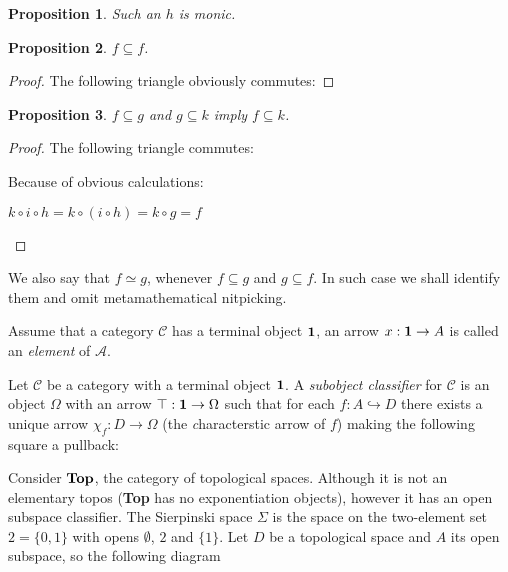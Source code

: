 \documentclass[a4paper]{article}
\theoremstyle{defin}
\theoremstyle{theorem}
\theoremstyle{claim}
\theoremstyle{prop}
\newtheorem{prop}{Proposition}
\theoremstyle{lemma}
\theoremstyle{fact}
\theoremstyle{ex}
\theoremstyle{col}
\begin{document}
\begin{prop}
Such an $h$ is monic.
\end{prop}

\begin{prop}
$f \subseteq f$.
\end{prop}

\begin{proof}
The following triangle obviously commutes:

\end{proof}

\begin{prop}
$f \subseteq g$ and $g \subseteq k$ imply $f \subseteq k$.
\end{prop}

\begin{proof}
The following triangle commutes:

Because of obvious calculations:
\begin{center}
$k \circ i \circ h = k \circ (i \circ h) = k \circ g = f$
\end{center}
\end{proof}

We also say that $f \simeq g$, whenever $f \subseteq g$ and $g \subseteq f$. In such case we shall identify them and omit metamathematical nitpicking.

Assume that a category $\mathcal{C}$ has a terminal object ${\bf 1}$, an arrow $x : {\bf 1} \to A$ is called an \emph{element} of $\mathcal{A}$.

Let $\mathcal{C}$ be a category with a terminal object ${\bf 1}$. A \emph{subobject classifier} for $\mathcal{C}$ is an object $\Omega$ with an arrow $\top : {\bf 1} \to \Omega$ such that for each $f : A \hookrightarrow D$ there exists a unique arrow $\chi_f : D \to \Omega$ (the {\emph characterstic arrow} of $f$) making the following square a pullback:


Consider ${\bf Top}$, the category of topological spaces. Although it is not an elementary topos ({\bf Top} has no exponentiation objects), however it has an open subspace classifier.
The Sierpinski space $\Sigma$ is the space on the two-element set $2 = \{ 0, 1 \}$ with opens $\emptyset$, $2$ and $\{ 1 \}$. Let $D$ be a topological space and $A$ its open subspace, so the following diagram
\end{document}

